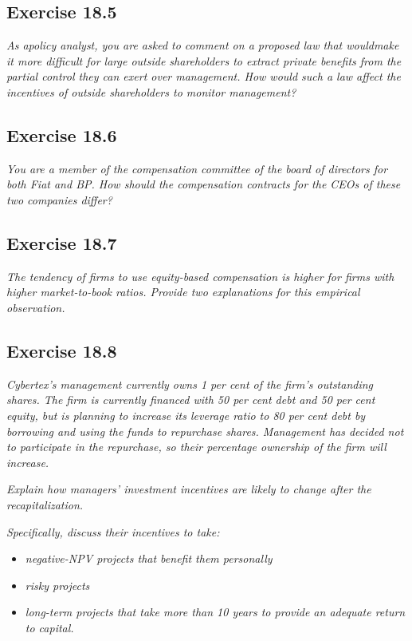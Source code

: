 \documentclass[]{book}
\theoremstyle{definition}
\theoremstyle{definition}
\theoremstyle{remark}
\begin{document}
\subsection{Exercise 18.5}\label{exercise-18.5}

\emph{As apolicy analyst, you are asked to comment on a proposed law
that wouldmake it more difficult for large outside shareholders to
extract private benefits from the partial control they can exert over
management. How would such a law affect the incentives of outside
shareholders to monitor management?} \citep[p.609]{book}

\subsection{Exercise 18.6}\label{exercise-18.6}

\emph{You are a member of the compensation committee of the board of
directors for both Fiat and BP. How should the compensation contracts
for the CEOs of these two companies differ?} \citep[p.609]{book}

\subsection{Exercise 18.7}\label{exercise-18.7}

\emph{The tendency of firms to use equity-based compensation is higher
for firms with higher market-to-book ratios. Provide two explanations
for this empirical observation.} \citep[p.609]{book}

\subsection{Exercise 18.8}\label{exercise-18.8}

\emph{Cybertex's management currently owns 1 per cent of the firm's
outstanding shares. The firm is currently financed with 50 per cent debt
and 50 per cent equity, but is planning to increase its leverage ratio
to 80 per cent debt by borrowing and using the funds to repurchase
shares. Management has decided not to participate in the repurchase, so
their percentage ownership of the firm will increase.}
\citep[p.609]{book}

\emph{Explain how managers' investment incentives are likely to change
after the recapitalization.} \citep[p.610]{book}

\emph{Specifically, discuss their incentives to take:}
\citep[p.610]{book}

\begin{itemize}
\item
  \emph{negative-NPV projects that benefit them personally}
  \citep[p.610]{book}
\item
  \emph{risky projects} \citep[p.610]{book}
\item
  \emph{long-term projects that take more than 10 years to provide an
  adequate return to capital.} \citep[p.610]{book}
\end{itemize}
\end{document}
